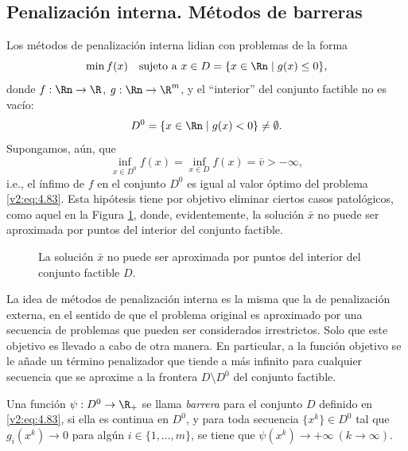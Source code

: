 
\subsection{Penalización interna. Métodos de barreras}\label{v2:sec:4.3.3}

Los métodos de penalización interna lidian con problemas de la forma
\begin{equation}
    \min f(x) \quad \text{sujeto a } x \in D = \{x \in \Rn \mid g(x) \le 0\},
    \label{v2:eq:4.83}
\end{equation}
donde $f : \Rn \to \R$, $g : \Rn \to \R^m$, y el ``interior'' del conjunto factible no es vacío:
\begin{equation}
    D^0 = \{x \in \Rn \mid g(x) < 0\} \neq \emptyset.
    \label{v2:eq:4.84}
\end{equation}
Supongamos, aún, que
\begin{equation}
    \inf_{x \in D^0} f(x) = \inf_{x \in D} f(x) = \bar{v} > -\infty,
    \label{v2:eq:4.85}
\end{equation}
i.e., el ínfimo de $f$ en el conjunto $D^0$ es igual al valor óptimo del problema \eqref{v2:eq:4.83}. Esta hipótesis tiene por objetivo eliminar ciertos casos patológicos, como aquel en la Figura \ref{v2:fig:4.3.5}, donde, evidentemente, la solución $\bar{x}$ no puede ser aproximada por puntos del interior del conjunto factible.

\begin{figure}[htpb]
    \centering
    \caption{La solución $\bar{x}$ no puede ser aproximada por puntos del interior del conjunto factible $D$.}
    \label{v2:fig:4.3.5}
\end{figure}

La idea de métodos de penalización interna es la misma que la de penalización externa, en el sentido de que el problema original es aproximado por una secuencia de problemas que pueden ser considerados irrestrictos. Solo que este objetivo es llevado a cabo de otra manera. En particular, a la función objetivo se le añade un término penalizador que tiende a más infinito para cualquier secuencia que se aproxime a la frontera $D \setminus D^0$ del conjunto factible.

\begin{definition}\label{v2:def:4.3.1}
    Una función $\psi : D^0 \to \R_+$ se llama \textit{barrera} para el conjunto $D$ definido en \eqref{v2:eq:4.83}, si ella es continua en $D^0$, y para toda secuencia $\{x^k\} \in D^0$ tal que $g_i(x^k) \to 0$ para algún $i \in \{1, \dots, m\}$, se tiene que $\psi(x^k) \to +\infty \ (k \to \infty)$.
\end{definition}

